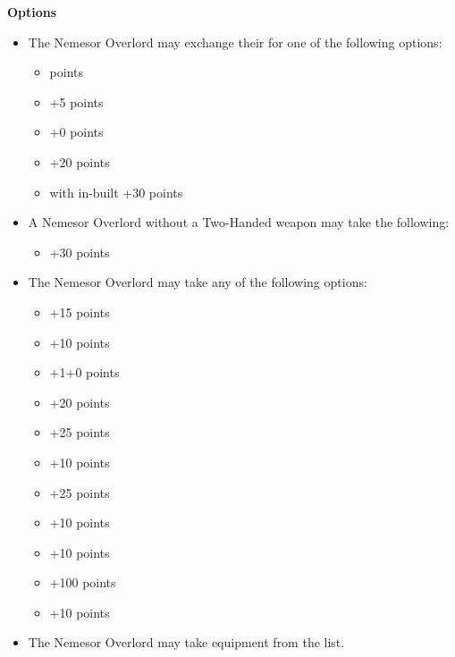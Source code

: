 \begin{minipage}[t]{0.72\textwidth}
	\vspace*{2em}
	\textbf{Options}
	\begin{itemize}
		\item The Nemesor Overlord may exchange their  for one of the following options:
		\begin{itemize}			
			\item {}  points
			\item {} \dotfill +5 points
			\item {} \dotfill +0 points
			\item {} \dotfill +20 points
			\item {} with in-built  \dotfill +30 points
		\end{itemize}
		\item A Nemesor Overlord without a Two-Handed weapon may take the following:
		\begin{itemize}
			\item {} \dotfill +30 points
		\end{itemize}
		\item The Nemesor Overlord may take any of the following options:
		\begin{itemize}
			\item {} \dotfill +15 points
			\item {} \dotfill +10 points
			\item {} \dotfill +1+0 points
			\item {} \dotfill +20 points
			\item {} \dotfill +25 points
			\item {} \dotfill +10 points
			\item {} \dotfill +25 points
			\item {} \dotfill +10 points
			\item {} \dotfill +10 points
			\item {} \dotfill +100 points
			\item {} \dotfill +10 points
		\end{itemize}
		\item The Nemesor Overlord may take equipment from the  list.
	\end{itemize}
\end{minipage}

